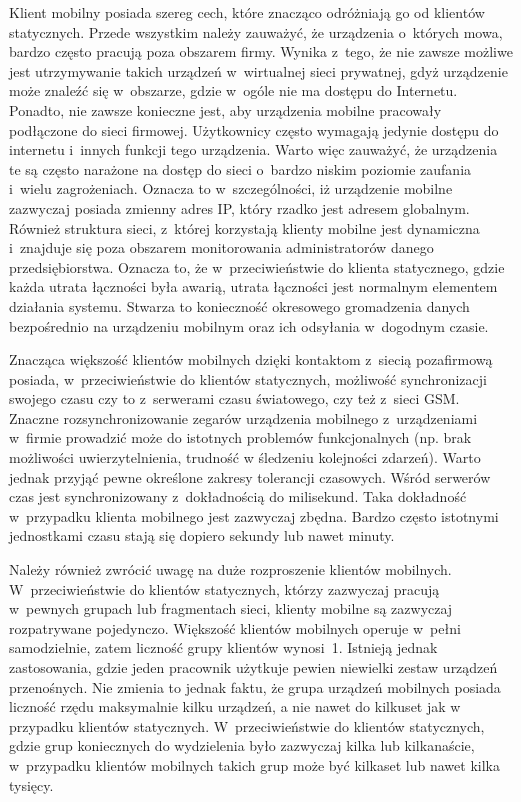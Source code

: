 Klient mobilny posiada szereg cech, które znacząco odróżniają go od
klientów statycznych. Przede wszystkim należy zauważyć, że urządzenia
o~których mowa, bardzo często pracują poza obszarem firmy. Wynika
z~tego, że nie zawsze możliwe jest utrzymywanie takich urządzeń
w~wirtualnej sieci prywatnej, gdyż urządzenie może znaleźć się
w~obszarze, gdzie w~ogóle nie ma dostępu do Internetu. Ponadto, nie
zawsze konieczne jest, aby urządzenia mobilne pracowały podłączone do
sieci firmowej. Użytkownicy często wymagają jedynie dostępu do
internetu i~innych funkcji tego urządzenia. Warto więc zauważyć, że
urządzenia te są często narażone na dostęp do sieci o~bardzo niskim
poziomie zaufania i~wielu zagrożeniach. Oznacza to w~szczególności, iż
urządzenie mobilne zazwyczaj posiada zmienny adres IP, który rzadko
jest adresem globalnym. Również struktura sieci, z~której korzystają
klienty mobilne jest dynamiczna i~znajduje się poza obszarem
monitorowania administratorów danego przedsiębiorstwa. Oznacza to, że
w~przeciwieństwie do klienta statycznego, gdzie każda utrata łączności
była awarią, utrata łączności jest normalnym elementem działania
systemu. Stwarza to konieczność okresowego gromadzenia danych
bezpośrednio na urządzeniu mobilnym oraz ich odsyłania w~dogodnym
czasie.

Znacząca większość klientów mobilnych dzięki kontaktom z~siecią
pozafirmową posiada, w~przeciwieństwie do klientów statycznych,
możliwość synchronizacji swojego czasu czy to z~serwerami czasu
światowego, czy też z~sieci GSM. Znaczne rozsynchronizowanie zegarów
urządzenia mobilnego z~urządzeniami w~firmie prowadzić może do
istotnych problemów funkcjonalnych (np. brak możliwości
uwierzytelnienia, trudność w śledzeniu kolejności zdarzeń). Warto
jednak przyjąć pewne określone zakresy tolerancji czasowych. Wśród
serwerów czas jest synchronizowany z~dokładnością do milisekund. Taka
dokładność w~przypadku klienta mobilnego jest zazwyczaj
zbędna. Bardzo często istotnymi jednostkami czasu stają się dopiero
sekundy lub nawet minuty.

Należy również zwrócić uwagę na duże rozproszenie klientów
mobilnych. W~przeciwieństwie do klientów statycznych, którzy zazwyczaj
pracują w~pewnych grupach lub fragmentach sieci, klienty mobilne są
zazwyczaj rozpatrywane pojedynczo. Większość klientów mobilnych
operuje w~pełni samodzielnie, zatem liczność grupy klientów
wynosi~1. Istnieją jednak zastosowania, gdzie jeden pracownik użytkuje
pewien niewielki zestaw urządzeń przenośnych. Nie zmienia to jednak
faktu, że grupa urządzeń mobilnych posiada liczność rzędu maksymalnie
kilku urządzeń, a nie nawet do kilkuset jak w przypadku klientów
statycznych. W~przeciwieństwie do klientów statycznych, gdzie grup
koniecznych do wydzielenia było zazwyczaj kilka lub kilkanaście,
w~przypadku klientów mobilnych takich grup może być kilkaset lub nawet
kilka tysięcy.


